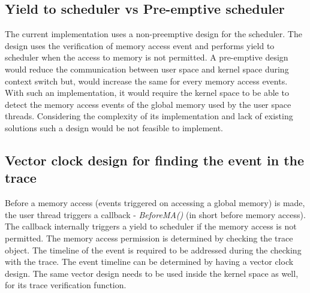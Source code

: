 \subsection{Yield to scheduler vs Pre-emptive scheduler}

The current implementation uses a non-preemptive design for the scheduler. 
The design uses the verification of memory access event and performs yield to scheduler when the access to memory is not permitted. 
A pre-emptive design would reduce the communication between user space and kernel space during context switch but, would increase the same for every memory access events. 
With such an implementation, it would require the kernel space to be able to detect the memory access events of the global memory used by the user space threads. 
Considering the complexity of its implementation and lack of existing solutions such a design would be not feasible to implement. 


\subsection{Vector clock design for finding the event in the trace}

Before a memory access (events triggered on accessing a global memory) is made, the user thread triggers a callback - \emph{BeforeMA()} (in short before memory access). 
The callback internally triggers a yield to scheduler if the memory access is not permitted. 
The memory access permission is determined by checking the trace object. 
The timeline of the event is required to be addressed during the checking with the trace. 
The event timeline can be determined by having a vector clock design. 
The same vector design needs to be used inside the kernel space as well, for its trace verification function.